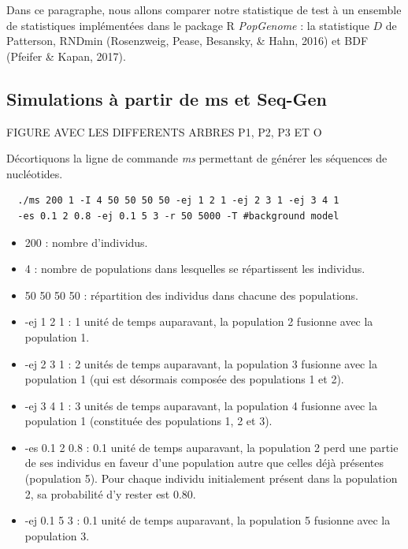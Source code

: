 \documentclass[12pt,twoside]{reedthesis}
\begin{document}
  Dans ce paragraphe, nous allons comparer notre statistique de test à un
  ensemble de statistiques implémentées dans le package R \emph{PopGenome}
  : la statistique \(D\) de Patterson, RNDmin (Rosenzweig, Pease,
  Besansky, \& Hahn, 2016) et BDF (Pfeifer \& Kapan, 2017).
  
  \subsection{Simulations à partir de ms et
  Seq-Gen}\label{simulations-a-partir-de-ms-et-seq-gen}
  
  FIGURE AVEC LES DIFFERENTS ARBRES P1, P2, P3 ET O
  
  Décortiquons la ligne de commande \emph{ms} permettant de générer les
  séquences de nucléotides.
  
  \begin{verbatim}
  ./ms 200 1 -I 4 50 50 50 50 -ej 1 2 1 -ej 2 3 1 -ej 3 4 1 
  -es 0.1 2 0.8 -ej 0.1 5 3 -r 50 5000 -T #background model
  \end{verbatim}
  
  \begin{itemize}
  \item
    200 : nombre d'individus.
  \item
    4 : nombre de populations dans lesquelles se répartissent les
    individus.
  \item
    50 50 50 50 : répartition des individus dans chacune des populations.
  \item
    -ej 1 2 1 : 1 unité de temps auparavant, la population 2 fusionne avec
    la population 1.
  \item
    -ej 2 3 1 : 2 unités de temps auparavant, la population 3 fusionne
    avec la population 1 (qui est désormais composée des populations 1 et
    2).
  \item
    -ej 3 4 1 : 3 unités de temps auparavant, la population 4 fusionne
    avec la population 1 (constituée des populations 1, 2 et 3).
  \item
    -es 0.1 2 0.8 : 0.1 unité de temps auparavant, la population 2 perd
    une partie de ses individus en faveur d'une population autre que
    celles déjà présentes (population 5). Pour chaque individu
    initialement présent dans la population 2, sa probabilité d'y rester
    est 0.80.
  \item
    -ej 0.1 5 3 : 0.1 unité de temps auparavant, la population 5 fusionne
    avec la population 3.
  \end{itemize}
  
\end{document}
